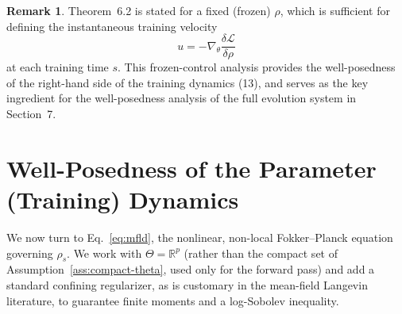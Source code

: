 \documentclass[11pt,a4wide]{article}
\theoremstyle{definition}
\newtheorem{remark}[theorem]{Remark}
\newcommand{\R}{\mathbb{R}}
\begin{document}
\begin{remark}

Theorem~6.2 is stated for a fixed (frozen) $\rho$, which is sufficient for defining the
instantaneous training velocity
\[
u=-\nabla_\theta\frac{\delta\mathcal L}{\delta\rho}
\]
at each training time $s$. This frozen-control analysis provides the well-posedness of the
right-hand side of the training dynamics (13), and serves as the key ingredient for the
well-posedness analysis of the full evolution system in Section~7.

\end{remark}

\section{Well-Posedness of the Parameter (Training) Dynamics}
\label{sec:training-wp}
\iffalse 
We now turn to Eq.~\eqref{eq:mfld}, the nonlinear, non-local Fokker--Planck equation governing $\rho_s$. We work with $\Theta=\R^p$ (rather than the compact set of Assumption~\ref{ass:compact-theta}, used only for the forward pass) and add a standard confining regularizer, as is customary in the mean-field Langevin literature, to guarantee finite moments and a log-Sobolev inequality.
\end{document}
